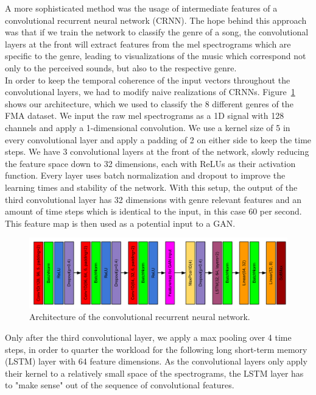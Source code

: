     A more sophisticated method was the usage of intermediate features of a convolutional recurrent neural network (CRNN).
    The hope behind this approach was that if we train the network to classify the genre of a song, the convolutional layers at the front will extract features from the mel spectrograms which are specific to the genre, leading to visualizations of the music which correspond not only to the perceived sounds, but also to the respective genre.\\
    In order to keep the temporal coherence of the input vectors throughout the convolutional layers, we had to modify naive realizations of CRNNs.
    Figure~\ref{CRNN} shows our architecture, which we used to classify the 8 different genres of the FMA dataset.
    We input the raw mel spectrograms as a 1D signal with 128 channels and apply a 1-dimensional convolution.
    We use a kernel size of 5 in every convolutional layer and apply a padding of 2 on either side to keep the time steps.
    We have 3 convolutional layers at the front of the network, slowly reducing the feature space down to 32 dimensions, each with ReLUs as their activation function.
    Every layer uses batch normalization and dropout to improve the learning times and stability of the network.
    With this setup, the output of the third convolutional layer has 32 dimensions with genre relevant features and an amount of time steps which is identical to the input, in this case 60 per second.
    This feature map is then used as a potential input to a GAN.\\
    \begin{figure}[t]
        \centering
        \includegraphics[width=\textwidth]{images/CRNNmodel}
        \caption{Architecture of the convolutional recurrent neural network.}
        \label{CRNN}
    \end{figure}
    Only after the third convolutional layer, we apply a max pooling over 4 time steps, in order to quarter the workload for the following long short-term memory (LSTM) layer with 64 feature dimensions.
    As the convolutional layers only apply their kernel to a relatively small space of the spectrograms, the LSTM layer has to "make sense" out of the sequence of convolutional features.

